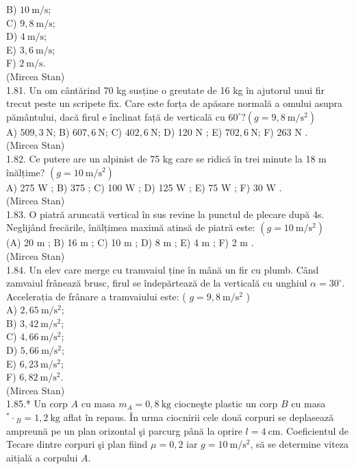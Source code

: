 \documentclass[10pt]{article}
\begin{document}
B) $10 \mathrm{~m} / \mathrm{s}$;\\
C) $9,8 \mathrm{~m} / \mathrm{s}$;\\
D) $4 \mathrm{~m} / \mathrm{s}$;\\
E) $3,6 \mathrm{~m} / \mathrm{s}$;\\
F) $2 \mathrm{~m} / \mathrm{s}$.\\
(Mircea Stan)\\
1.81. Un om cântărind 70 kg susține o greutate de 16 kg în ajutorul unui fir trecut peste un scripete fix. Care este forța de apăsare normală a omului asupra pământului, dacă firul e înclinat față de verticală cu $60^{\circ} ?\left(g=9,8 \mathrm{~m} / \mathrm{s}^{2}\right)$\\
A) $509,3 \mathrm{~N}$; B) $607,6 \mathrm{~N}$; C) $402,6 \mathrm{~N}$; D) 120 N ; E) $702,6 \mathrm{~N}$; F) 263 N .\\
(Mircea Stan)\\
1.82. Ce putere are un alpinist de 75 kg care se ridică în trei minute la 18 m înălțime? $\left(g=10 \mathrm{~m} / \mathrm{s}^{2}\right)$\\
A) 275 W ; B) 375 ; C) 100 W ; D) 125 W ; E) 75 W ; F) 30 W .\\
(Mircea Stan)\\
1.83. O piatră aruncată vertical în sus revine la punctul de plecare după 4s. Neglijând frecările, înălțimea maximă atinsă de piatră este: $\left(g=10 \mathrm{~m} / \mathrm{s}^{2}\right)$\\
(A) 20 m ; B) 16 m ; C) 10 m ; D) 8 m ; E) 4 m ; F) 2 m .\\
(Mircea Stan)\\
1.84. Un elev care merge cu tramvaiul ține în mână un fir cu plumb. Când zamvaiul frânează brusc, firul se îndepărtează de la verticală cu unghiul $\alpha=30^{\circ}$.\\
Accelerația de frânare a tramvaiului este: ( $g=9,8 \mathrm{~m} / \mathrm{s}^{2}$ )\\
A) $2,65 \mathrm{~m} / \mathrm{s}^{2}$;\\
B) $3,42 \mathrm{~m} / \mathrm{s}^{2}$;\\
C) $4,66 \mathrm{~m} / \mathrm{s}^{2}$;\\
D) $5,66 \mathrm{~m} / \mathrm{s}^{2}$;\\
E) $6,23 \mathrm{~m} / \mathrm{s}^{2}$;\\
F) $6,82 \mathrm{~m} / \mathrm{s}^{2}$.\\
(Mircea Stan)\\
1.85.* Un corp $A$ cu masa $m_{A}=0,8 \mathrm{~kg}$ ciocneşte plastic un corp $B$ cu masa ${ }^{*} \cdot{ }_{B}=1,2 \mathrm{~kg}$ aflat în repaus. În urma ciocnirii cele două corpuri se deplasează ampreună pe un plan orizontal şi parcurg până la oprire $l=4 \mathrm{~cm}$. Coeficientul de Tecare dintre corpuri şi plan fiind $\mu=0,2$ iar $g=10 \mathrm{~m} / \mathrm{s}^{2}$, să se determine viteza aitịală a corpului $A$.\\
\end{document}
